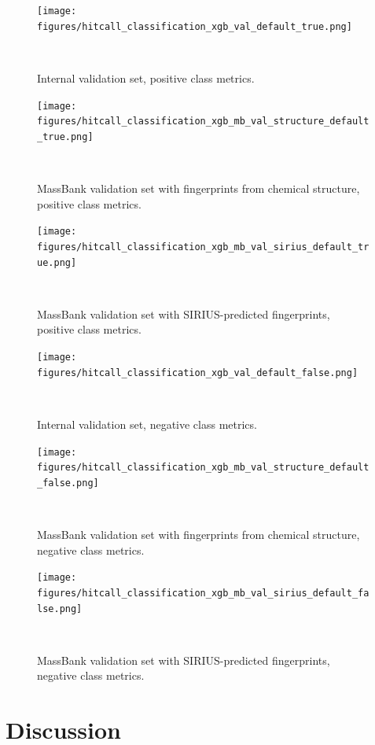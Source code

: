 \begin{figure}
  \centering
  \texttt{[image: figures/hitcall\_classification\_xgb\_val\_default\_true.png]}
  \caption{Internal validation set, positive class metrics.}
~\label{fig:hitcall_classification_xgb_val_default_true}
\end{figure}

\begin{figure}
  \centering
  \texttt{[image: figures/hitcall\_classification\_xgb\_mb\_val\_structure\_default\_true.png]}
  \caption{MassBank validation set with fingerprints from chemical structure, positive class metrics.}
~\label{fig:hitcall_classification_xgb_mb_val_structure_default_true}
\end{figure}

\begin{figure}
  \centering
  \texttt{[image: figures/hitcall\_classification\_xgb\_mb\_val\_sirius\_default\_true.png]}
  \caption{MassBank validation set with SIRIUS-predicted fingerprints, positive class metrics.}
~\label{fig:hitcall_classification_xgb_mb_val_sirius_default_true}
\end{figure}


\begin{figure}
  \centering
  \texttt{[image: figures/hitcall\_classification\_xgb\_val\_default\_false.png]}
  \caption{Internal validation set, negative class metrics.}
~\label{fig:hitcall_classification_xgb_val_default_false}
\end{figure}

\begin{figure}
  \centering
  \texttt{[image: figures/hitcall\_classification\_xgb\_mb\_val\_structure\_default\_false.png]}
  \caption{MassBank validation set with fingerprints from chemical structure, negative class metrics.}
~\label{fig:hitcall_classification_xgb_mb_val_structure_default_false}
\end{figure}

\begin{figure}
  \centering
  \texttt{[image: figures/hitcall\_classification\_xgb\_mb\_val\_sirius\_default\_false.png]}
  \caption{MassBank validation set with SIRIUS-predicted fingerprints, negative class metrics.}
~\label{fig:hitcall_classification_xgb_mb_val_sirius_default_false}
\end{figure}

\newpage

\section{Discussion}












